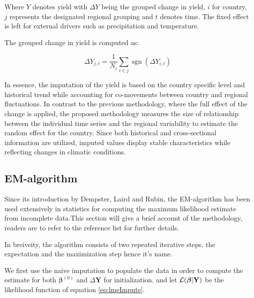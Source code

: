 \documentclass[nojss]{jss}\usepackage[]{graphicx}\usepackage[]{color}
\DeclareMathOperator{\sgn}{sgn}
\begin{document}
Where $Y$ denotes yield with $\Delta{Y}$ being the grouped change in
yield, $i$ for country, $j$ represents the designated regional
grouping and $t$ denotes time. The fixed effect is left for external
drivers such as precipitation and temperature.

The grouped change in yield is computed as:

\begin{equation}
  \label{eq:DeltaYield}
  \Delta{Y}_{j, t} = \frac{1}{N_i}\sum_{i \in j} \sgn(\Delta{Y}_{i, t})
\end{equation}


In essence, the imputation of the yield is based on the country
specific level and historical trend while accounting for co-movements
between country and regional fluctuations. In contrast to the previous
methodology, where the full effect of the change is applied, the
proposed methodology measures the size of relationship between the
individual time series and the regional variability to estimate the
random effect for the country. Since both historical and
cross-sectional information are utilized, imputed values display
stable characteristics while reflecting changes in climatic
conditions.


\subsection{EM-algorithm}
Since its introduction by Dempster, Laird and Rubin, the EM-algorithm
has been used extensively in statistics for computing the maximum
likelihood estimate from incomplete data.This section will give a
brief account of the methodology, readers are to refer to the
reference list for further details.

In breiveity, the algorithm consists of two repeated iterative steps,
the expectation and the maximization step hence it's name.

We first use the naive imputation to populate the data in order to
compute the estimate for both $\boldsymbol{\beta}^{(0)}$ and
$\Delta\mathbf{Y}$ for initialization. and let
$\cal{L}(\boldsymbol{\beta}|\mathbf{Y})$ be the likelihood function of
equation \ref{eq:lmeImpute}.
\end{document}
